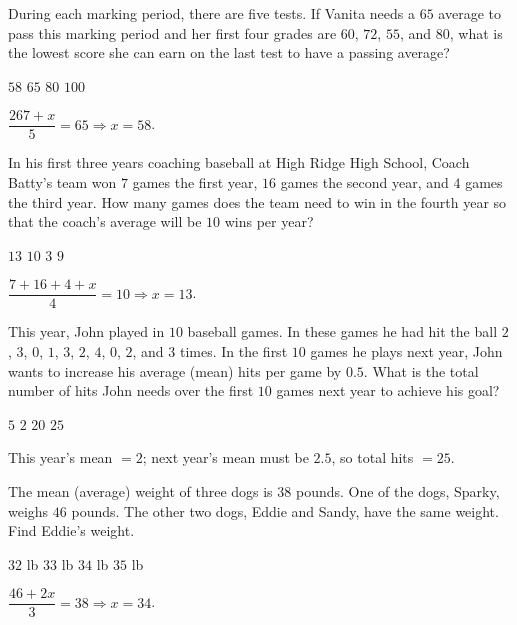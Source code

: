 \question[5]
During each marking period, there are five tests. If Vanita needs a $65$ average to pass this marking period and her first four grades are $60$, $72$, $55$, and $80$, what is the lowest score she can earn on the last test to have a passing average?
\begin{choices}
  \CorrectChoice $58$
  \choice $65$
  \choice $80$
  \choice $100$
\end{choices}
\begin{solution}
  $\dfrac{267+x}{5}=65\Rightarrow x=58$.
\end{solution}

\question[5]
In his first three years coaching baseball at High Ridge High School, Coach Batty's team won $7$ games the first year, $16$ games the second year, and $4$ games the third year. How many games does the team need to win in the fourth year so that the coach's average will be $10$ wins per year?
\begin{choices}
  \CorrectChoice $13$
  \choice $10$
  \choice $3$
  \choice $9$
\end{choices}
\begin{solution}
  $\dfrac{7+16+4+x}{4}=10\Rightarrow x=13$.
\end{solution}

\question[5]
This year, John played in $10$ baseball games. In these games he had hit the ball $2$, $3$, $0$, $1$, $3$, $2$, $4$, $0$, $2$, and $3$ times. In the first $10$ games he plays next year, John wants to increase his average (mean) hits per game by $0.5$. What is the total number of hits John needs over the first $10$ games next year to achieve his goal?
\begin{choices}
  \choice $5$
  \choice $2$
  \choice $20$
  \CorrectChoice $25$
\end{choices}
\begin{solution}
  This year's mean $=2$; next year's mean must be $2.5$, so total hits $=25$.
\end{solution}


\newpage



\question[5]
The mean (average) weight of three dogs is $38$ pounds. One of the dogs, Sparky, weighs $46$ pounds. The other two dogs, Eddie and Sandy, have the same weight. Find Eddie's weight.
\begin{choices}
  \choice $32$ lb
  \choice $33$ lb
  \CorrectChoice $34$ lb
  \choice $35$ lb
\end{choices}
\begin{solution}
  $\dfrac{46+2x}{3}=38\Rightarrow x=34$.
\end{solution}

